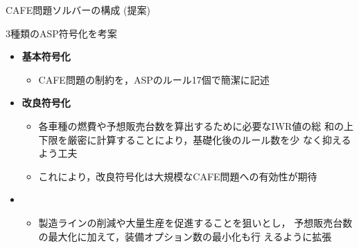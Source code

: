 \documentclass[dvipdfmx, 11pt]{beamer}
\begin{document}
 \begin{frame}{CAFE問題ソルバーの構成 (提案)}
   \scalebox{0.9}{\centering}
   \begin{block}{3種類のASP符号化を考案}
     \begin{itemize}
     \item \alert{\bf 基本符号化}
       \begin{itemize}
       \item CAFE問題の制約を，ASPのルール17個で簡潔に記述
       \end{itemize}
     \item \alert{\bf 改良符号化}
       \begin{itemize}
       \item 各車種の燃費や予想販売台数を算出するために必要なIWR値の総
         和の上下限を厳密に計算することにより，基礎化後のルール数を少
         なく抑えるよう工夫
       \item これにより，改良符号化は大規模なCAFE問題への有効性が期待
       \end{itemize}
     \item {}
       \begin{itemize}
         \item 製造ラインの削減や大量生産を促進することを狙いとし，
           予想販売台数の最大化に加えて，装備オプション数の最小化も行
           えるように拡張
       \end{itemize}
     \end{itemize}
   \end{block}
 \end{frame}
\end{document}
